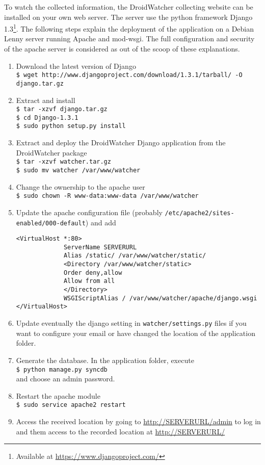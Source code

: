 To watch the collected information, the DroidWatcher collecting website can be installed on your own web server.
The server use the python framework Django 1.3\footnote{Available at \url{https://www.djangoproject.com/}}.
The following steps explain the deployment of the application on a Debian Lenny server running Apache and mod-wsgi. The full configuration and security of the apache server is considered as out of the scoop of these explanations.

\begin{enumerate}
\item Download the latest version of Django\\
  \texttt{\$ wget http://www.djangoproject.com/download/1.3.1/tarball/ -O django.tar.gz}
\item Extract and install\\
  \texttt{\$ tar -xzvf django.tar.gz\\\$ cd Django-1.3.1\\\$ sudo python setup.py install}
\item Extract and deploy the DroidWatcher Django application from the DroidWatcher package\\
  \texttt{\$ tar -xzvf watcher.tar.gz\\\$ sudo mv watcher /var/www/watcher}
\item Change the ownership to the apache user\\
  \texttt{\$ sudo chown -R www-data:www-data /var/www/watcher}
\item Update the apache configuration file (probably \texttt{/etc/apache2/sites-enabled/000-default}) and add
\begin{verbatim}
<VirtualHost *:80>
             ServerName SERVERURL
             Alias /static/ /var/www/watcher/static/
             <Directory /var/www/watcher/static>
             Order deny,allow
             Allow from all
             </Directory>
             WSGIScriptAlias / /var/www/watcher/apache/django.wsgi
</VirtualHost>
\end{verbatim}
\item Update eventually the django setting in \texttt{watcher/settings.py} files if you want to configure your email or have changed the location of the application folder.
\item Generate the database. In the application folder, execute\\
  \texttt{\$ python manage.py syncdb}\\
  and choose an admin password.
\item Restart the apache module\\
  \texttt{\$ sudo service apache2 restart}
\item Access the received location by going to \url{http://SERVERURL/admin} to log in and them access to the recorded location at \url{http://SERVERURL/}
\end{enumerate}

